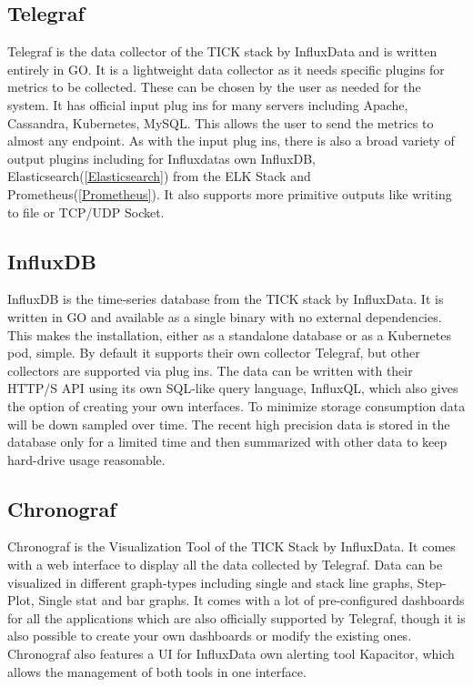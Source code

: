 \subsection{Telegraf}
Telegraf is the data collector of the TICK stack by InfluxData and is written entirely in GO. It is a lightweight data collector as it needs specific plugins for metrics to be collected. These can be chosen by the user as needed for the system. It has official input plug ins for many servers including Apache, Cassandra, Kubernetes, MySQL.
 This allows the user to send the metrics to almost any endpoint. As with the input plug ins, there is also a broad variety of output plugins including for Influxdatas own InfluxDB, Elasticsearch(\ref{Elasticsearch}) from the ELK Stack and Prometheus(\ref{Prometheus}). It also supports more primitive outputs like writing to file or TCP/UDP Socket.
\subsection{InfluxDB}
InfluxDB is the time-series database from the TICK stack by InfluxData. It is written in GO and available as a single binary with no external dependencies. This makes the installation, either as a standalone database or as a Kubernetes pod, simple.
By default it supports their own collector Telegraf, but other collectors are supported via plug ins. The data can be written with their  HTTP/S API using its own SQL-like query language, InfluxQL, which also gives the option of creating your own interfaces.
To minimize storage consumption data will be down sampled over time. The recent high precision data is stored in the database only for a limited time and then summarized with other data to keep hard-drive usage reasonable. 
\subsection{Chronograf}
Chronograf is the Visualization Tool of the TICK Stack by InfluxData. It comes with a web interface to display all the data collected by Telegraf. Data can be visualized in different graph-types including single and stack line graphs, Step-Plot, Single stat and bar graphs. It comes with a lot of pre-configured dashboards for all the applications which are also officially supported by Telegraf, though it is also possible to create your own dashboards or modify the existing ones. 
Chronograf also features a UI for InfluxData own alerting tool Kapacitor, which allows the management of both tools in one interface.
